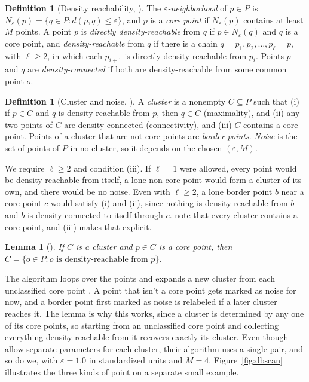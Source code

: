 \documentclass[11pt]{article}
\newtheorem{lemma}[theorem]{Lemma}
\theoremstyle{definition}
\newtheorem{definition}[theorem]{Definition}
\theoremstyle{remark}
\begin{document}
\begin{definition}[Density reachability, {\cite[Defs.~1--4]{ester1996dbscan}}]
The \emph{$\varepsilon$-neighborhood} of $p \in P$ is $N_\varepsilon(p) = \{ q \in P : d(p,q) \le \varepsilon \}$, and $p$ is a \emph{core point} if $N_\varepsilon(p)$ contains at least $M$ points.
A point $p$ is \emph{directly density-reachable} from $q$ if $p \in N_\varepsilon(q)$ and $q$ is a core point, and \emph{density-reachable} from $q$ if there is a chain $q = p_1, p_2, \dots, p_\ell = p$, with $\ell \ge 2$, in which each $p_{i+1}$ is directly density-reachable from $p_i$.
Points $p$ and $q$ are \emph{density-connected} if both are density-reachable from some common point $o$.
\end{definition}
\begin{definition}[Cluster and noise, {\cite[Defs.~5--6]{ester1996dbscan}}]
A \emph{cluster} is a nonempty $C \subseteq P$ such that (i) if $p \in C$ and $q$ is density-reachable from $p$, then $q \in C$ (maximality), and (ii) any two points of $C$ are density-connected (connectivity), and (iii) $C$ contains a core point.
Points of a cluster that are not core points are \emph{border points}.
\emph{Noise} is the set of points of $P$ in no cluster, so it depends on the chosen $(\varepsilon, M)$.
\end{definition}
We require $\ell \ge 2$ and condition (iii). If $\ell = 1$ were allowed, every point would be density-reachable from itself, a lone non-core point would form a cluster of its own, and there would be no noise. Even with $\ell \ge 2$, a lone border point $b$ near a core point $c$ would satisfy (i) and (ii), since nothing is density-reachable from $b$ and $b$ is density-connected to itself through $c$. \textcite[p.~228]{ester1996dbscan} note that every cluster contains a core point, and (iii) makes that explicit.
\begin{lemma}[{\cite[Lemma~2]{ester1996dbscan}}]
If $C$ is a cluster and $p \in C$ is a core point, then $C = \{ o \in P : o \text{ is density-reachable from } p \}$.
\end{lemma}
The algorithm loops over the points and expands a new cluster from each unclassified core point \parencite[p.~229]{ester1996dbscan}. A point that isn't a core point gets marked as noise for now, and a border point first marked as noise is relabeled if a later cluster reaches it.
The lemma is why this works, since a cluster is determined by any one of its core points, so starting from an unclassified core point and collecting everything density-reachable from it recovers exactly its cluster.
Even though \textcite{ester1996dbscan} allow separate parameters for each cluster, their algorithm uses a single pair, and so do we, with $\varepsilon = 1.0$ in standardized units and $M = 4$.
Figure~\ref{fig:dbscan} illustrates the three kinds of point on a separate small example.
\end{document}
